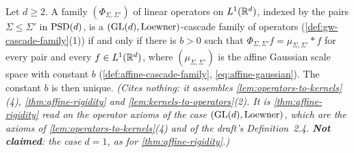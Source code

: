 \begin{theorem}
\label{thm:affine-rigidity-operators}
\leanok
Let $d \ge 2$. A family $(\Phi_{\Sigma,\Sigma'})$ of linear operators on $L^1(\mathbb{R}^d)$, indexed by the
pairs $\Sigma \le \Sigma'$ in $\mathrm{PSD}(d)$, is a $(\mathrm{GL}(d), \text{Loewner})$-cascade family of operators
(\ref{def:gw-cascade-family}(1)) if and only if there is $b > 0$ such that
$\Phi_{\Sigma,\Sigma'}f = \mu_{\Sigma,\Sigma'} * f$ for every pair and every $f \in L^1(\mathbb{R}^d)$, where
$(\mu_{\Sigma,\Sigma'})$ is the affine Gaussian scale space with constant $b$
(\ref{def:affine-cascade-family}, \ref{eq:affine-gaussian}). The constant $b$ is then unique.
\statusT\quad\emph{(Cites nothing: it assembles \ref{lem:operators-to-kernels}(4),
\ref{thm:affine-rigidity} and \ref{lem:kernels-to-operators}(2). It is \ref{thm:affine-rigidity} read
on the operator axioms of the case $(\mathrm{GL}(d), \text{Loewner})$, which are the axioms of
\ref{lem:operators-to-kernels}(4) and of the draft's Definition~2.4. \textbf{Not claimed}:
the case $d = 1$, as for \ref{thm:affine-rigidity}.)}
\end{theorem}

